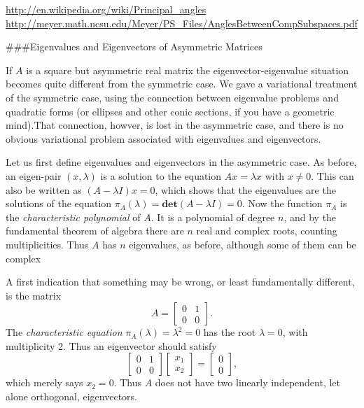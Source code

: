 \documentclass[
  12pt,
]{book}
\begin{document}
\url{http://en.wikipedia.org/wiki/Principal_angles}
\url{http://meyer.math.ncsu.edu/Meyer/PS_Files/AnglesBetweenCompSubspaces.pdf}

\#\#\#Eigenvalues and Eigenvectors of Asymmetric Matrices

If \(A\) is a square but asymmetric real matrix the eigenvector-eigenvalue situation becomes quite different
from the symmetric case. We gave a variational treatment
of the symmetric case, using the connection between
eigenvalue problems and quadratic forms (or ellipses and other conic sections, if you have a geometric mind).That connection, howver, is lost in the asymmetric case, and there is no obvious variational problem associated with eigenvalues and eigenvectors.

Let us first define eigenvalues and eigenvectors in the asymmetric case. As before, an eigen-pair \((x,\lambda)\) is a solution to the equation \(Ax=\lambda x\) with \(x\not= 0\). This can also be written as \((A-\lambda I)x=0\), which shows that the eigenvalues are the solutions of the
equation \(\pi_A(\lambda)=\mathbf{det}(A-\lambda I)=0\). Now the function \(\pi_A\) is the
\emph{characteristic polynomial} of \(A\). It is a polynomial of degree \(n\), and by the fundamental theorem of algebra there are \(n\) real and complex roots, counting multiplicities. Thus \(A\) has \(n\)
eigenvalues, as before, although some of them can be complex

A first indication that something may be wrong, or least fundamentally different, is the matrix
\[
A=\begin{bmatrix}0&1\\0&0\end{bmatrix}.
\]
The \emph{characteristic equation} \(\pi_A(\lambda)=\lambda^2=0\) has the root \(\lambda=0\), with multiplicity 2. Thus an eigenvector
should satisfy
\[
\begin{bmatrix}0&1\\0&0\end{bmatrix}\begin{bmatrix}x_1\\x_2\end{bmatrix}=\begin{bmatrix}0\\0\end{bmatrix},
\]
which merely says \(x_2=0\). Thus \(A\) does not have
two linearly independent, let alone orthogonal, eigenvectors.
\end{document}

